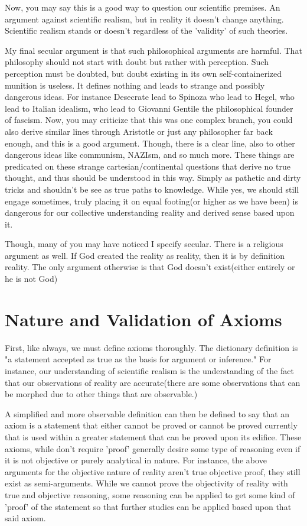 \par Now, you may say this is a good way to question our scientific premises. An argument against scientific realism, but in reality it doesn't change anything. Scientific realism stands or doesn't regardless of the 'validity' of such theories. 
\par My final secular argument is that such philosophical arguments are harmful. That philosophy should not start with doubt but rather with perception. Such perception must be doubted, but doubt existing in its own self-containerized munition is useless. It defines nothing and leads to strange and possibly dangerous ideas. For instance Desecrate lead to Spinoza who lead to Hegel, who lead to Italian idealism, who lead to Giovanni Gentile the philosophical founder of fascism. Now, you may criticize that this was one complex branch, you could also derive similar lines through Aristotle or just any philosopher far back enough, and this is a good argument. Though, there is a clear line, also to other dangerous ideas like communism, NAZIsm, and so much more. These things are predicated on these strange cartesian/continental questions that derive no true thought, and thus should be understood in this way. Simply as pathetic and dirty tricks and shouldn't be see as true paths to knowledge. While yes, we should still engage sometimes, truly placing it on equal footing(or higher as we have been) is dangerous for our collective understanding reality and derived sense based upon it.
\par Though, many of you may have noticed I specify secular. There is a religious argument as well. If God created the reality as reality, then it is by definition reality. The only argument otherwise is that God doesn't exist(either entirely or he is not God)

\section{Nature and Validation of Axioms}
\par First, like always, we must define axioms thoroughly. The dictionary definition is "a statement accepted as true as the basis for argument or inference." For instance, our understanding of scientific realism is the understanding of the fact that our observations of reality are accurate(there are some observations that can be morphed due to other things that are observable.)
\par A simplified and more observable definition can then be defined to say that an axiom is a statement that either cannot be proved or cannot be proved currently that is used within a greater statement that can be proved upon its edifice. These axioms, while don't require 'proof' generally desire some type of reasoning even if it is not objective or purely analytical in nature. For instance, the above arguments for the objective nature of reality aren't true objective proof, they still exist as semi-arguments. While we cannot prove the objectivity of reality with true and objective reasoning, some reasoning can be applied to get some kind of 'proof' of the statement so that further studies can be applied based upon that said axiom.
